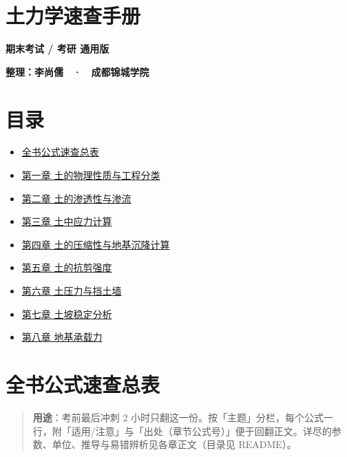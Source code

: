 \documentclass[
]{article}
\author{}
\date{}
\providecommand{\tightlist}{%
  \setlength{\itemsep}{0pt}\setlength{\parskip}{0pt}}
\begin{document}
\section{土力学速查手册}\label{ux571fux529bux5b66ux901fux67e5ux624bux518c}

\textbf{期末考试 / 考研 通用版}

\textbf{整理：李尚儒　·　成都锦城学院}

\newpage

\section{目录}\label{ux76eeux5f55}

\begin{itemize}
\tightlist
\item
  \hyperref[ux5168ux4e66ux516cux5f0fux901fux67e5ux603bux8868]{全书公式速查总表}
\item
  \hyperref[ux7b2cux4e00ux7ae0-ux571fux7684ux7269ux7406ux6027ux8d28ux4e0eux5de5ux7a0bux5206ux7c7b]{第一章
  土的物理性质与工程分类}
\item
  \hyperref[ux7b2cux4e8cux7ae0-ux571fux7684ux6e17ux900fux6027ux4e0eux6e17ux6d41]{第二章
  土的渗透性与渗流}
\item
  \hyperref[ux7b2cux4e09ux7ae0-ux571fux4e2dux5e94ux529bux8ba1ux7b97]{第三章
  土中应力计算}
\item
  \hyperref[ux7b2cux56dbux7ae0-ux571fux7684ux538bux7f29ux6027ux4e0eux5730ux57faux6c89ux964dux8ba1ux7b97]{第四章
  土的压缩性与地基沉降计算}
\item
  \hyperref[ux7b2cux4e94ux7ae0-ux571fux7684ux6297ux526aux5f3aux5ea6]{第五章
  土的抗剪强度}
\item
  \hyperref[ux7b2cux516dux7ae0-ux571fux538bux529bux4e0eux6321ux571fux5899]{第六章
  土压力与挡土墙}
\item
  \hyperref[ux7b2cux4e03ux7ae0-ux571fux5761ux7a33ux5b9aux5206ux6790]{第七章
  土坡稳定分析}
\item
  \hyperref[ux7b2cux516bux7ae0-ux5730ux57faux627fux8f7dux529b]{第八章
  地基承载力}
\end{itemize}

\newpage

\section{全书公式速查总表}\label{ux5168ux4e66ux516cux5f0fux901fux67e5ux603bux8868}

\begin{quote}
\textbf{用途}：考前最后冲刺 2
小时只翻这一份。按「主题」分栏，每个公式一行，附「适用/注意」与「出处（章节公式号）」便于回翻正文。详尽的参数、单位、推导与易错辨析见各章正文（目录见
README）。
\end{quote}
\end{document}
